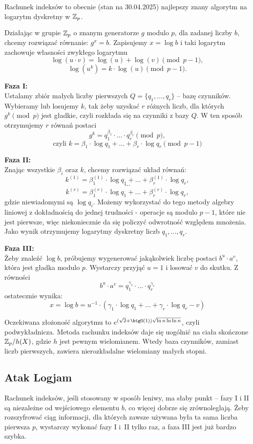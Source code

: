 Rachunek indeksów to obecnie (stan na 30.04.2025) najlepszy znany algorytm na logarytm dyskretny w \( \mathbb{Z}_p \).

Działając w grupie \( \mathbb{Z}_p \) o znanym generatorze \( g \) modulo \( p \), dla zadanej liczby \( b \), chcemy rozwiązać równanie: \( g^x = b \).
Zapisujemy \( x = \log b \) i taki logarytm zachowuje własności zwykłego logarytmu
\[
    \log(u \cdot v) = \log(u) + \log(v) \pmod{p-1},
\]
\[
    \log(u^k) = k \cdot \log(u) \pmod{p-1}.
\]

\textbf{Faza I:} \\
Ustalamy zbiór małych liczby pierwszych \( Q = \{q_1, \dots, q_r\} \) -- bazę czynników.
Wybieramy lub losujemy \( k \), tak żeby uzyskać \( r \) różnych liczb, dla których \( g^k \pmod{p} \) jest gładkie, czyli rozkłada się na czynniki z bazy \( Q \). W ten sposób otrzymujemy \( r \) równań postaci
\[
    g^k = q_1^{\beta_1} \cdot \ldots \cdot q_r^{\beta_r} \pmod{p},
\]
\[
    \text{czyli } k = \beta_1 \cdot \log q_1 + \ldots + \beta_r \cdot \log q_r \pmod{p - 1}
\]

\textbf{Faza II:} \\
Znając wszystkie \( \beta_i \) oraz \( k \), chcemy rozwiązać układ równań:
\[
    k^{(1)} = \beta_1^{(1)} \cdot \log q_1 + \ldots + \beta_r^{(1)} \cdot \log q_r,
\]
\[
    \cdots
\]
\[
    k^{(r)} = \beta_1^{(r)} \cdot \log q_1 + \ldots + \beta_r^{(r)} \cdot \log q_r,
\]
gdzie niewiadomymi są \( \log q_i \). Możemy wykorzystać do tego metody algebry liniowej z dokładnością do jednej trudności - operacje są modulo \( p-1 \), które nie jest pierwsze, więc niekoniecznie da się policzyć odwrotność względem mnożenia.
Jako wynik otrzymujemy logarytmy dyskretny liczb \( q_1, \dots, q_r \).

\textbf{Faza III:} \\
Żeby znaleźć \( \log b \), próbujemy wygenerować jakąkolwiek liczbę postaci \( b^u \cdot a^v \), która jest gładka modulo \( p \). Wystarczy przyjąć \( u = 1 \) i losować \( v \) do skutku. Z równości
\[ b^u \cdot a^v = q_1^{\gamma_1} \cdot \ldots \cdot q_r^{\gamma_r} \]
ostatecznie wynika:
\[ x = \log b = u^{-1} \cdot (\gamma_1 \cdot \log q_1 + \ldots + \gamma_r \cdot \log q_r - v) \]

Oczekiwana złożoność algorytmu to \( e^{(\sqrt{2}+\bigO(1))\sqrt{\ln n \ln\ln n}} \), czyli podwykładnicza. Metoda rachunku indeksów daje się uogólnić na ciała skończone \( \mathbb{Z}_p/h(X) \), gdzie \( h \) jest pewnym wielomianem. Wtedy baza czynników, zamiast liczb pierwszych, zawiera nierozkładalne wielomiany małych stopni.

\subsection{Atak Logjam}
Rachunek indeksów, jeśli stosowany w sposób leniwy, ma słaby punkt -- fazy I i II są niezależne od wejściowego elementu \( b \), co więcej dobrze się zrównoleglają.
Żeby rozszyfrować ciąg informacji, dla których zawsze używana była ta sama liczba pierwsza \( p \), wystarczy wykonać fazy I i~II tylko raz, a faza III jest już bardzo szybka.